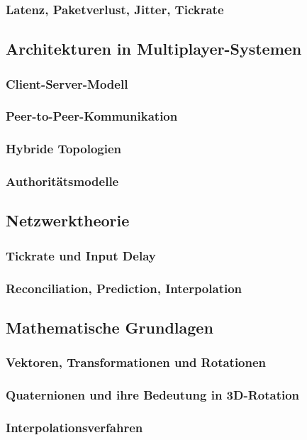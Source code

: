 \documentclass{article}
\begin{document}
\subsubsection{Latenz, Paketverlust, Jitter, Tickrate}
\subsection{Architekturen in Multiplayer-Systemen}
\subsubsection{Client-Server-Modell}
\subsubsection{Peer-to-Peer-Kommunikation}
\subsubsection{Hybride Topologien}
\subsubsection{Authoritätsmodelle}
\subsection{Netzwerktheorie}
\subsubsection{Tickrate und Input Delay}
\subsubsection{Reconciliation, Prediction, Interpolation}
\subsection{Mathematische Grundlagen}
\subsubsection{Vektoren, Transformationen und Rotationen}
\subsubsection{Quaternionen und ihre Bedeutung in 3D-Rotation}
\subsubsection{Interpolationsverfahren}
\newpage
\end{document}
